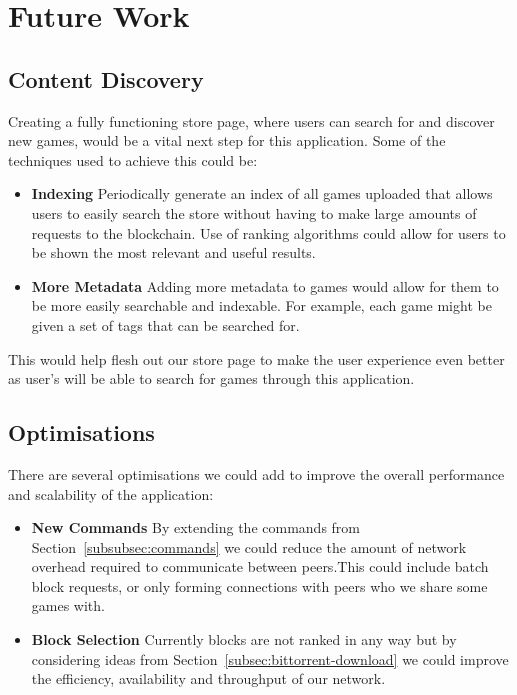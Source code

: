 \section{Future Work}

\subsection*{Content Discovery}
Creating a fully functioning store page, where users can search for and discover new games, would be a vital next step for this application. Some of the techniques used to achieve this could be:

\begin{itemize}
  \item \textbf{Indexing} Periodically generate an index of all games uploaded that allows users to easily search the store without having to make large amounts of requests to the blockchain. Use of ranking algorithms could allow for users to be shown the most relevant and useful results.
  \item \textbf{More Metadata} Adding more metadata to games would allow for them to be more easily searchable and indexable. For example, each game might be given a set of tags that can be searched for.
\end{itemize}

\vspace{2mm}\noindent
This would help flesh out our store page to make the user experience even better as user's will be able to search for games through this application.

\subsection*{Optimisations}

There are several optimisations we could add to improve the overall performance and scalability of the application:

\begin{itemize}
  \item \textbf{New Commands} By extending the commands from Section~\ref{subsubsec:commands} we could reduce the amount of network overhead required to communicate between peers.\newline This could include batch block requests, or only forming connections with peers who we share some games with.
  \item \textbf{Block Selection} Currently blocks are not ranked in any way but by considering ideas from Section~\ref{subsec:bittorrent-download} we could improve the efficiency, availability and throughput of our network.
\end{itemize}
